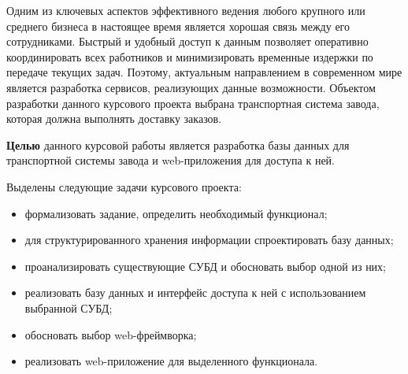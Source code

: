 Одним из ключевых аспектов эффективного ведения любого крупного или среднего бизнеса в настоящее время является хорошая связь между его сотрудниками\cite{info_business}. Быстрый и удобный доступ к данным позволяет оперативно координировать всех работников и минимизировать временные издержки по передаче текущих задач. Поэтому, актуальным направлением в современном мире является разработка сервисов, реализующих данные возможности. Объектом разработки данного курсового проекта выбрана транспортная система завода, которая должна выполнять доставку заказов.

\textbf{Целью} данного курсовой работы является разработка базы данных для транспортной системы завода и web-приложения для доступа к ней.

Выделены следующие задачи курсового проекта:
\begin{itemize}
	\item формализовать задание, определить необходимый функционал;
	\item для структурированного хранения информации спроектировать базу данных;
	\item проанализировать существующие СУБД и обосновать выбор одной из них;
	\item реализовать базу данных и интерфейс доступа к ней с использованием выбранной СУБД;
	\item обосновать выбор web-фреймворка;
	\item реализовать web-приложение для выделенного функционала.
\end{itemize}
